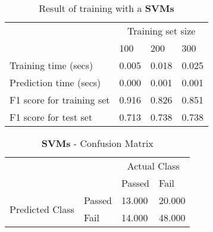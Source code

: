 \documentclass[12pt]{article}
\begin{document}
\setlength{\extrarowheight}{1.5pt}
\begin{table}[!htbp]
\caption{Result of training with a \textbf{SVMs}} %
\centering %
\begin{tabular}{|p{6cm}|p{1.5cm}|p{1.5cm}|p{1.5cm}|} %
\hline %
& \multicolumn{3}{c|}{Training set size}\\[5pt]
\cline{2-4} 
& 100 & 200 & 300\\[0.5ex]
\hline %

Training time (secs)   &       0.005 & 0.018 & 0.025 \\
Prediction time (secs)   &     0.000 & 0.001 & 0.001 \\
F1 score for training set  &   0.916 & 0.826 & 0.851 \\
F1 score for test set    &     0.713 & 0.738 & 0.738 \\
\hline %
\end{tabular}
\label{svmTable}
\end{table}

\setlength{\extrarowheight}{1.5pt}
\begin{table}[!htbp]
\caption{\textbf{SVMs} - Confusion Matrix} %
\centering %
\begin{tabular}{ |l|l|p{3cm}|p{3cm}| }
\hline %
\multirow{2}{*}{} & & \multicolumn{2}{c|}{Actual Class} \\ 
\cline{3-4}
\multirow{2}{*}{} & & Passed & Fail \\ 
\hline
\multirow{2}{1.5in}{Predicted Class} & Passed & 13.000 & 20.000 \\ 
 & Fail & 14.000 & 48.000  \\ \hline
\end{tabular}
\end{table}
\end{document}
